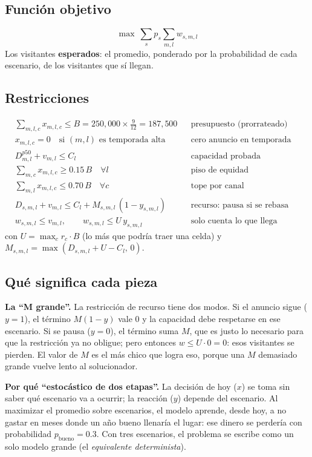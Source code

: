 \subsection{Función objetivo}
\[
\max\ \sum_{s}p_s\sum_{m,l}w_{s,m,l}
\]
Los visitantes \textbf{esperados}: el promedio, ponderado por la probabilidad de cada escenario, de los visitantes que sí
llegan.

\subsection{Restricciones}
\begin{align}
&\textstyle\sum_{m,l,c}x_{m,l,c}\le B=250{,}000\times\tfrac{9}{12}=187{,}500 &&\text{presupuesto (prorrateado)}\\
&x_{m,l,c}=0\quad\text{si }(m,l)\text{ es temporada alta} &&\text{cero anuncio en temporada alta}\\
&D^{p50}_{m,l}+v_{m,l}\le C_l &&\text{capacidad probada}\\
&\textstyle\sum_{m,c}x_{m,l,c}\ge0.15\,B\quad\forall l &&\text{piso de equidad}\\
&\textstyle\sum_{m,l}x_{m,l,c}\le0.70\,B\quad\forall c &&\text{tope por canal}\\
&D_{s,m,l}+v_{m,l}\le C_l+M_{s,m,l}\,(1-y_{s,m,l}) &&\text{recurso: pausa si se rebasa}\\
&w_{s,m,l}\le v_{m,l},\qquad w_{s,m,l}\le U\,y_{s,m,l} &&\text{solo cuenta lo que llega}
\end{align}
con $U=\max_c r_c\cdot B$ (lo más que podría traer una celda) y $M_{s,m,l}=\max(D_{s,m,l}+U-C_l,\,0)$.

\subsection{Qué significa cada pieza}
\textbf{La ``M grande''.} La restricción de recurso tiene dos modos. Si el anuncio sigue ($y=1$), el término
$M(1-y)$ vale 0 y la capacidad debe respetarse en ese escenario. Si se pausa ($y=0$), el término suma $M$, que es justo lo
necesario para que la restricción ya no obligue; pero entonces $w\le U\cdot0=0$: esos visitantes se pierden. El valor de
$M$ es el más chico que logra eso, porque una $M$ demasiado grande vuelve lento al solucionador.

\textbf{Por qué ``estocástico de dos etapas''.} La decisión de hoy ($x$) se toma sin saber qué escenario va a ocurrir; la
reacción ($y$) depende del escenario. Al maximizar el promedio sobre escenarios, el modelo aprende, desde hoy, a no
gastar en meses donde un año bueno llenaría el lugar: ese dinero se perdería con probabilidad $p_{\text{bueno}}=0.3$.
Con tres escenarios, el problema se escribe como un solo modelo grande (el \emph{equivalente determinista}).

